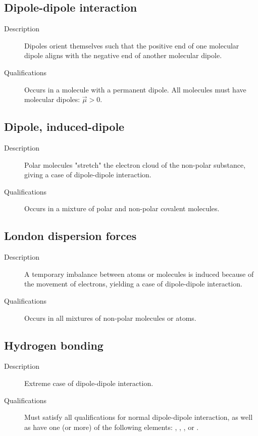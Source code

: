\subsection{Dipole-dipole interaction}
\begin{description}
  \item[Description] Dipoles orient themselves such that the positive end of one
    molecular dipole aligns with the negative end of another molecular dipole.
  \item[Qualifications] Occurs in a molecule with a permanent dipole. All
    molecules must have molecular dipoles: $\vec{\mu} > 0$.
\end{description}

\subsection{Dipole, induced-dipole}
\begin{description}
  \item[Description] Polar molecules "stretch" the electron cloud of the
    non-polar substance, giving a case of dipole-dipole interaction.
  \item[Qualifications] Occurs in a mixture of polar and non-polar covalent
    molecules.
\end{description}

\subsection{London dispersion forces}
\begin{description}
  \item[Description] A temporary imbalance between atoms or molecules is induced
    because of the movement of electrons, yielding a case of dipole-dipole
    interaction.
  \item[Qualifications] Occurs in all mixtures of non-polar molecules or atoms.
\end{description}

\subsection{Hydrogen bonding}
\begin{description}
  \item[Description] Extreme case of dipole-dipole interaction.
  \item[Qualifications] Must satisfy all qualifications for normal dipole-dipole
    interaction, as well as have one (or more) of the following elements:
    , , , or .
\end{description}

